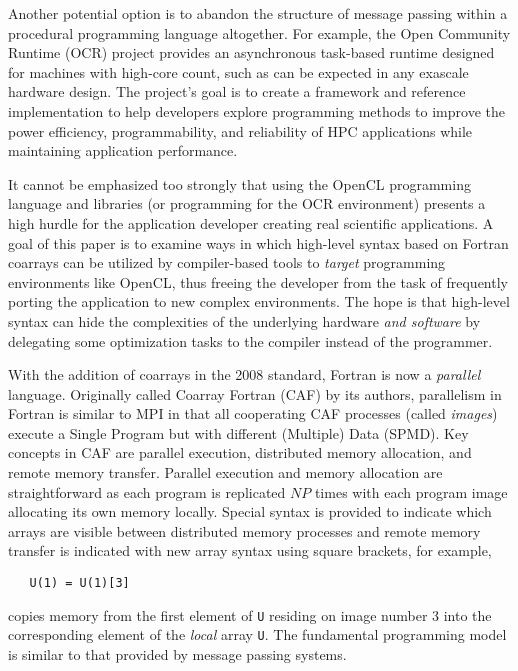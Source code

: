 Another potential option is to abandon the structure of message passing within a procedural
programming language altogether.  For example, the Open Community Runtime (OCR)
project\cite{OCR:wiki:url} provides an asynchronous task-based runtime designed for
machines with high-core count\cite{Dokulil20151453}, such as can be expected in any
exascale hardware design.  The project's goal is to create a framework and reference
implementation to help developers explore programming methods to improve the power
efficiency, programmability, and reliability of HPC applications while maintaining
application performance.

\begin{comment}
OCR helps the application developer with the complex process of writing multi-core
applications.  It does this by providing facilities for creating and executing a set of
tasks.  The OCR runtime schedules the execution of these tasks based on events which
embody dataflow and code flow dependencies; when all of the dependencies for a task are
satisfied, the task can be run.
\end{comment}

It cannot be emphasized too strongly that using the OpenCL programming language and
libraries (or programming for the OCR environment) presents a high hurdle for the
application developer creating real scientific applications.  A goal of this paper is to
examine ways in which high-level syntax based on Fortran coarrays can be utilized by
compiler-based tools to \emph{target} programming environments like OpenCL, thus
freeing the developer from the task of frequently porting the application to new complex
environments.  The hope is that high-level syntax can hide the complexities of the
underlying hardware \emph{and software} by delegating some optimization tasks to the
compiler instead of the programmer.


With the addition of coarrays in the 2008 standard, Fortran is now a \emph{parallel}
language.  Originally called Coarray Fortran (CAF) by its
authors\cite{Numrich:1998:CFP:289918.289920}, parallelism in Fortran is similar to MPI in
that all cooperating CAF processes (called \emph{images}) execute a Single Program but with
different (Multiple) Data (SPMD).  Key concepts in CAF are parallel execution, distributed
memory allocation, and remote memory transfer.  Parallel execution and memory allocation
are straightforward as each program is replicated $NP$ times with each program image
allocating its own memory locally.  Special syntax is provided to indicate which arrays
are visible between distributed memory processes and remote memory transfer is indicated
with new array syntax using square brackets, for example,
\begin{verbatim}
   U(1) = U(1)[3]
\end{verbatim}
copies memory from the first element of \texttt{U} residing on image number 3 into
the corresponding element of the \emph{local} array \texttt{U}.  The fundamental programming
model is similar to that provided by message passing systems.

